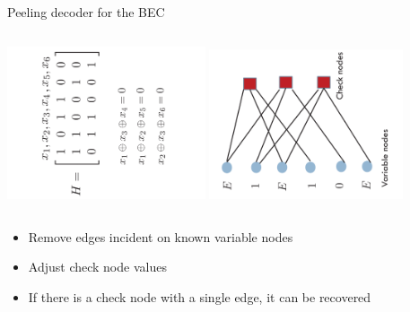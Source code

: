 \documentclass[10pt,xcolor=table]{beamer}
\begin{document}
\begin{frame}{Peeling decoder for the BEC}
\begin{columns}
\includegraphics[width=2.3in,angle=-90]{./Figures/paritycheckmatrix63code}
\includegraphics[width=2.25in,angle=-90]{./Figures/Tannergraph63codewitherasures}
\end{columns}
\begin{block}{}
\begin{itemize}
  \item Remove edges incident on known variable nodes
  \item Adjust check node values
  \item If there is a check node with a single edge, it can be recovered
\end{itemize}
\end{block}
\end{frame}
\end{document}

